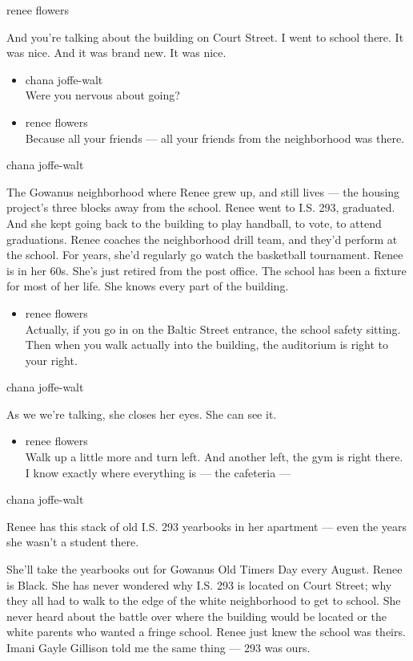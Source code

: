 renee flowers

And you're talking about the building on Court Street. I went to school
there. It was nice. And it was brand new. It was nice.

\begin{itemize}
\item
  chana joffe-walt\\
  Were you nervous about going?
\item
  renee flowers\\
  Because all your friends --- all your friends from the neighborhood
  was there.
\end{itemize}

chana joffe-walt

The Gowanus neighborhood where Renee grew up, and still lives --- the
housing project's three blocks away from the school. Renee went to I.S.
293, graduated. And she kept going back to the building to play
handball, to vote, to attend graduations. Renee coaches the neighborhood
drill team, and they'd perform at the school. For years, she'd regularly
go watch the basketball tournament. Renee is in her 60s. She's just
retired from the post office. The school has been a fixture for most of
her life. She knows every part of the building.

\begin{itemize}
\tightlist
\item
  renee flowers\\
  Actually, if you go in on the Baltic Street entrance, the school
  safety sitting. Then when you walk actually into the building, the
  auditorium is right to your right.
\end{itemize}

chana joffe-walt

As we we're talking, she closes her eyes. She can see it.

\begin{itemize}
\tightlist
\item
  renee flowers\\
  Walk up a little more and turn left. And another left, the gym is
  right there. I know exactly where everything is --- the cafeteria ---
\end{itemize}

chana joffe-walt

Renee has this stack of old I.S. 293 yearbooks in her apartment --- even
the years she wasn't a student there.

She'll take the yearbooks out for Gowanus Old Timers Day every August.
Renee is Black. She has never wondered why I.S. 293 is located on Court
Street; why they all had to walk to the edge of the white neighborhood
to get to school. She never heard about the battle over where the
building would be located or the white parents who wanted a fringe
school. Renee just knew the school was theirs. Imani Gayle Gillison told
me the same thing --- 293 was ours.

